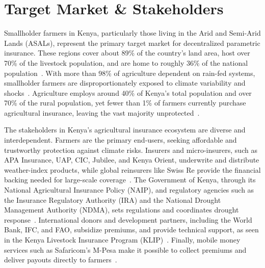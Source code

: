 \documentclass[11pt,a4paper]{article}
\begin{document}
    \section{Target Market \& Stakeholders}\label{sec:targetmarket}
    Smallholder farmers in Kenya, particularly those living in the Arid and Semi-Arid Lands (ASALs), represent the primary target market for decentralized parametric insurance.
    These regions cover about 89\% of the country's land area, host over 70\% of the livestock population, and are home to roughly 36\% of the national population~\parencite{IUCN, NDMA2021, UNEP-DHI}.
    With more than 98\% of agriculture dependent on rain-fed systems, smallholder farmers are disproportionately exposed to climate variability and shocks~\parencite{GovernmentOfKenya2017}.
    Agriculture employs around 40\% of Kenya's total population and over 70\% of the rural population, yet fewer than 1\% of farmers currently purchase agricultural insurance, leaving the vast majority unprotected~\parencite{FAO2024, MinistryOfAgriculture2023}.

    The stakeholders in Kenya's agricultural insurance ecosystem are diverse and interdependent.
    Farmers are the primary end-users, seeking affordable and trustworthy protection against climate risks.
    Insurers and micro-insurers, such as APA Insurance, UAP, CIC, Jubilee, and Kenya Orient, underwrite and distribute weather-index products, while global reinsurers like Swiss Re provide the financial backing needed for large-scale coverage~\parencite{Artemis2017, BASIS2017}.
    The Government of Kenya, through its National Agricultural Insurance Policy (NAIP), and regulatory agencies such as the Insurance Regulatory Authority (IRA) and the National Drought Management Authority (NDMA), sets regulations and coordinates drought response~\parencite{AfricanClimateFoundation2024, MinistryOfAgriculture2023}.
    International donors and development partners, including the World Bank, IFC, and FAO, subsidize premiums, and provide technical support, as seen in the Kenya Livestock Insurance Program (KLIP)~\parencite{Artemis2017, WorldBank2022}.
    Finally, mobile money services such as Safaricom's M-Pesa make it possible to collect premiums and deliver payouts directly to farmers~\parencite{OxfordBusinessGroup2017}.
\end{document}
